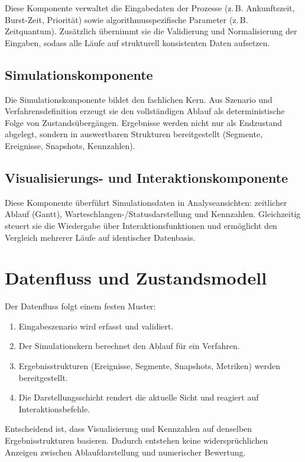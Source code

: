 Diese Komponente verwaltet die Eingabedaten der Prozesse (z.\,B. Ankunftszeit, Burst-Zeit, Priorität) sowie algorithmusspezifische Parameter (z.\,B. Zeitquantum). Zusätzlich übernimmt sie die Validierung und Normalisierung der Eingaben, sodass alle Läufe auf strukturell konsistenten Daten aufsetzen.

\subsection{Simulationskomponente}

Die Simulationskomponente bildet den fachlichen Kern. Aus Szenario und Verfahrensdefinition erzeugt sie den vollständigen Ablauf als deterministische Folge von Zustandsübergängen. Ergebnisse werden nicht nur als Endzustand abgelegt, sondern in auswertbaren Strukturen bereitgestellt (Segmente, Ereignisse, Snapshots, Kennzahlen).

\subsection{Visualisierungs- und Interaktionskomponente}

Diese Komponente überführt Simulationsdaten in Analyseansichten: zeitlicher Ablauf (Gantt), Warteschlangen-/Statusdarstellung und Kennzahlen. Gleichzeitig steuert sie die Wiedergabe über Interaktionsfunktionen und ermöglicht den Vergleich mehrerer Läufe auf identischer Datenbasis.

\section{Datenfluss und Zustandsmodell}

Der Datenfluss folgt einem festen Muster:

\begin{enumerate}
    \item Eingabeszenario wird erfasst und validiert.
    \item Der Simulationskern berechnet den Ablauf für ein Verfahren.
    \item Ergebnisstrukturen (Ereignisse, Segmente, Snapshots, Metriken) werden bereitgestellt.
    \item Die Darstellungsschicht rendert die aktuelle Sicht und reagiert auf Interaktionsbefehle.
\end{enumerate}

Entscheidend ist, dass Visualisierung und Kennzahlen auf denselben Ergebnisstrukturen basieren. Dadurch entstehen keine widersprüchlichen Anzeigen zwischen Ablaufdarstellung und numerischer Bewertung.

